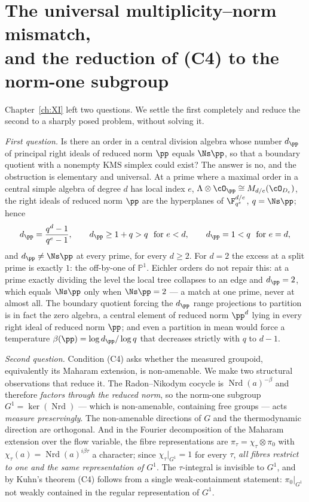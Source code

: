 \chapter[Multiplicity--norm mismatch and the reduction of (C4)]{The universal multiplicity--norm mismatch,\\ and the reduction of \textup{(C4)} to the norm-one subgroup}\label{ch:XII}
\renewcommand{\Nrd}{\operatorname{Nrd}}
\begin{summary}
Chapter~\ref{ch:XI} left two questions. We settle the first completely and reduce the
second to a sharply posed problem, without solving it.

\emph{First question.} Is there an order in a central division algebra whose number
$d_\pp$ of principal right ideals of reduced norm $\pp$ equals $\Ns\pp$, so that a boundary
quotient with a nonempty $\mathrm{KMS}$ simplex could exist? The answer is no, and the
obstruction is elementary and universal. At a prime where a maximal order in a central
simple algebra of degree $d$ has local index $e$, $\Lambda\otimes\cO_\pp\cong M_{d/e}(\cO_{D_e})$,
the right ideals of reduced norm $\pp$ are the hyperplanes of $\F_{q^e}^{d/e}$, $q=\Ns\pp$;
hence
\[
d_\pp=\frac{q^d-1}{q^e-1},\qquad d_\pp\ge1+q>q\ \text{ for }e<d,\qquad d_\pp=1<q\ \text{ for }e=d,
\]
and $d_\pp\ne\Ns\pp$ at every prime, for every $d\ge2$. For $d=2$ the excess at a split prime
is exactly $1$: the off-by-one of $\mathbb P^1$. Eichler orders do not repair this: at a
prime exactly dividing the level the local tree collapses to an edge and $d_\pp=2$, which
equals $\Ns\pp$ only when $\Ns\pp=2$ --- a match at one prime, never at almost all. The
boundary quotient forcing the $d_\pp$ range projections to partition is in fact the zero
algebra, a central element of reduced norm $\pp^d$ lying in every right ideal of reduced norm
$\pp$; and even a partition in mean would force a temperature
$\beta(\pp)=\log d_\pp/\log q$ that decreases strictly with $q$ to $d-1$.

\emph{Second question.} Condition (C4) asks whether the measured groupoid, equivalently its
Maharam extension, is non-amenable. We make two structural observations that reduce it.
The Radon--Nikodym cocycle is $\Nrd(a)^{-\beta}$ and therefore \emph{factors through the
reduced norm}, so the norm-one subgroup $G^1=\ker(\Nrd)$ --- which is non-amenable,
containing free groups --- acts \emph{measure preservingly}. The non-amenable directions of
$G$ and the thermodynamic direction are orthogonal. And in the Fourier decomposition of the
Maharam extension over the flow variable, the fibre representations are
$\pi_\tau=\chi_\tau\otimes\pi_0$ with $\chi_\tau(a)=\Nrd(a)^{i\beta\tau}$ a character; since
$\chi_\tau|_{G^1}=1$ for every $\tau$, \emph{all fibres restrict to one and the same
representation of $G^1$}. The $\tau$-integral is invisible to $G^1$, and by Kuhn's theorem
(C4) follows from a single weak-containment statement: $\pi_0|_{G^1}$ not weakly contained in
the regular representation of $G^1$.


\end{summary}
